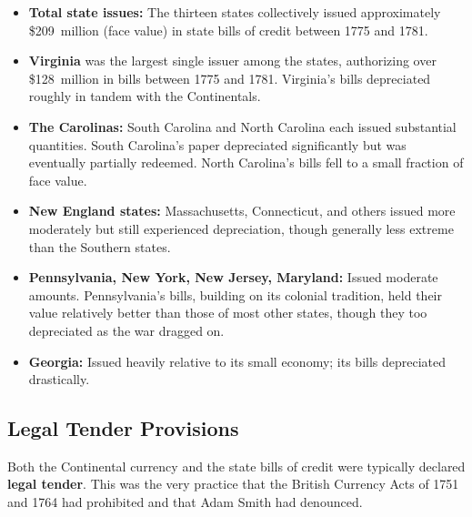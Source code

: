 \documentclass[12pt]{article}
\begin{document}
\begin{itemize}
    \item \textbf{Total state issues:} The thirteen states collectively issued
    approximately \$209~million (face value) in state bills of credit between
    1775 and 1781.

    \item \textbf{Virginia} was the largest single issuer among the states,
    authorizing over \$128~million in bills between 1775 and 1781.
    Virginia's bills depreciated roughly in tandem with the Continentals.

    \item \textbf{The Carolinas:} South Carolina and North Carolina each issued
    substantial quantities.  South Carolina's paper depreciated significantly
    but was eventually partially redeemed.  North Carolina's bills fell to a
    small fraction of face value.

    \item \textbf{New England states:} Massachusetts, Connecticut, and others
    issued more moderately but still experienced depreciation, though generally
    less extreme than the Southern states.

    \item \textbf{Pennsylvania, New York, New Jersey, Maryland:} Issued moderate
    amounts.  Pennsylvania's bills, building on its colonial tradition,
    held their value relatively better than those of most other states, though
    they too depreciated as the war dragged on.

    \item \textbf{Georgia:} Issued heavily relative to its small economy; its
    bills depreciated drastically.
\end{itemize}

\subsection{Legal Tender Provisions}

Both the Continental currency and the state bills of credit were typically
declared \textbf{legal tender}.  This was the very practice that the British
Currency Acts of 1751 and 1764 had prohibited and that Adam Smith had denounced.
\end{document}
